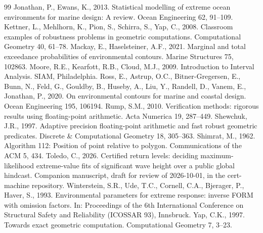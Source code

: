 \documentclass[preprint,11pt,authoryear]{elsarticle}
\begin{document}
\begin{thebibliography}{99}
 Jonathan, P., Ewans, K., 2013. Statistical modelling of extreme ocean environments for marine design: A review. Ocean Engineering 62, 91--109.
 Kettner, L., Mehlhorn, K., Pion, S., Schirra, S., Yap, C., 2008. Classroom examples of robustness problems in geometric computations. Computational Geometry 40, 61--78.
 Mackay, E., Haselsteiner, A.F., 2021. Marginal and total exceedance probabilities of environmental contours. Marine Structures 75, 102863.
 Moore, R.E., Kearfott, R.B., Cloud, M.J., 2009. Introduction to Interval Analysis. SIAM, Philadelphia.
 Ross, E., Astrup, O.C., Bitner-Gregersen, E., Bunn, N., Feld, G., Gouldby, B., Huseby, A., Liu, Y., Randell, D., Vanem, E., Jonathan, P., 2020. On environmental contours for marine and coastal design. Ocean Engineering 195, 106194.
 Rump, S.M., 2010. Verification methods: rigorous results using floating-point arithmetic. Acta Numerica 19, 287--449.
 Shewchuk, J.R., 1997. Adaptive precision floating-point arithmetic and fast robust geometric predicates. Discrete \& Computational Geometry 18, 305--363.
 Shimrat, M., 1962. Algorithm 112: Position of point relative to polygon. Communications of the ACM 5, 434.
 Toledo, C., 2026. Certified return levels: deciding maximum-likelihood extreme-value fits of significant wave height over a public global hindcast. Companion manuscript, draft for review of 2026-10-01, in the cert-machine repository.
 Winterstein, S.R., Ude, T.C., Cornell, C.A., Bjerager, P., Haver, S., 1993. Environmental parameters for extreme response: inverse FORM with omission factors. In: Proceedings of the 6th International Conference on Structural Safety and Reliability (ICOSSAR 93), Innsbruck.
 Yap, C.K., 1997. Towards exact geometric computation. Computational Geometry 7, 3--23.
\end{thebibliography}
\end{document}
